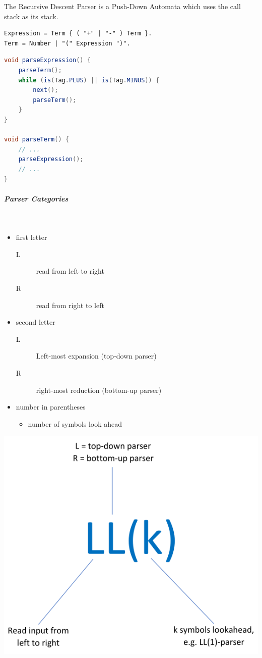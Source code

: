 \documentclass[11pt,twoside,landscape]{article}
\begin{document}
\begin{multicols}{3}
The Recursive Descent Parser is a Push-Down Automata which uses the call stack as its stack.

\begin{verbatim}
Expression = Term { ( "+" | "-" ) Term }.
Term = Number | "(" Expression ")".
\end{verbatim}

\begin{lstlisting}[language=java,numbers=none]
void parseExpression() {
    parseTerm();
    while (is(Tag.PLUS) || is(Tag.MINUS)) {
        next();
        parseTerm();
    }
}

void parseTerm() {
    // ...
    parseExpression();
    // ...
}
\end{lstlisting}
\subparagraph{Parser Categories} \
\label{sec:orgebc730c}
\begin{itemize}
\item first letter
\begin{description}
\item[{L}] read from left to right
\item[{R}] read from right to left
\end{description}
\item second letter
\begin{description}
\item[{L}] Left-most expansion (top-down parser)
\item[{R}] right-most reduction (bottom-up parser)
\end{description}
\item number in parentheses
\begin{itemize}
\item number of symbols look ahead
\end{itemize}
\end{itemize}

{
\begin{center}
\includegraphics[width=.9\linewidth]{img/parser_notation.png}
\end{center}
\label{fig:parser-notation}
}

\end{multicols}
\end{document}
